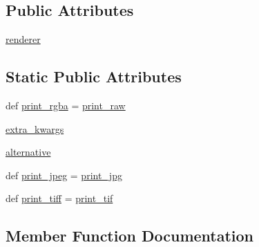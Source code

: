 \subsection*{Public Attributes}
\begin{DoxyCompactItemize}
\item 
\hyperlink{classmatplotlib_1_1backends_1_1backend__agg_1_1FigureCanvasAgg_a9978ef99a5d8c3d3010855782c075dc9}{renderer}
\end{DoxyCompactItemize}
\subsection*{Static Public Attributes}
\begin{DoxyCompactItemize}
\item 
def \hyperlink{classmatplotlib_1_1backends_1_1backend__agg_1_1FigureCanvasAgg_aeea417aeb25a241d816568f42f4acc57}{print\+\_\+rgba} = \hyperlink{classmatplotlib_1_1backends_1_1backend__agg_1_1FigureCanvasAgg_aee1e2db948fa61185852f863465843c8}{print\+\_\+raw}
\item 
\hyperlink{classmatplotlib_1_1backends_1_1backend__agg_1_1FigureCanvasAgg_ad6e40e990a77897a791c725b77be6336}{extra\+\_\+kwargs}
\item 
\hyperlink{classmatplotlib_1_1backends_1_1backend__agg_1_1FigureCanvasAgg_a7a588e55ba966e077e5521b307c5955d}{alternative}
\item 
def \hyperlink{classmatplotlib_1_1backends_1_1backend__agg_1_1FigureCanvasAgg_af6d3e6cd76b53f2c21002cf572823489}{print\+\_\+jpeg} = \hyperlink{classmatplotlib_1_1backends_1_1backend__agg_1_1FigureCanvasAgg_a2751e214e7473bce0c1e8324e057adb5}{print\+\_\+jpg}
\item 
def \hyperlink{classmatplotlib_1_1backends_1_1backend__agg_1_1FigureCanvasAgg_a724ad3bc9601d1c3135c55f9a07cc740}{print\+\_\+tiff} = \hyperlink{classmatplotlib_1_1backends_1_1backend__agg_1_1FigureCanvasAgg_a71b633e45152cc6f3bfc96f2a248a331}{print\+\_\+tif}
\end{DoxyCompactItemize}


\subsection{Member Function Documentation}
\mbox{\label{classmatplotlib_1_1backends_1_1backend__agg_1_1FigureCanvasAgg_adac1dbd2691b2feb8f757fcb448168fd}} 
